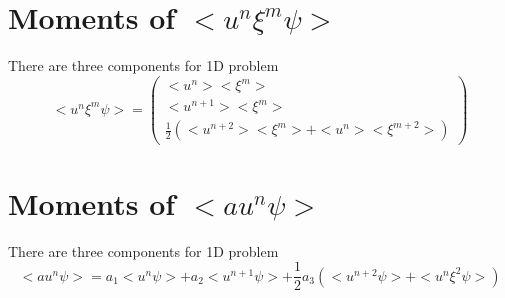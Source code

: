 \documentclass[a4paper]{book}
\begin{document}
\begin{appendices}
    \section*{Moments of $<u^n\xi^m\psi>$}
    There are three components for 1D problem
    $$
    <u^n\xi^m\psi>=\begin{pmatrix}
        <u^n><\xi^m>\\
        <u^{n+1}><\xi^m>\\
        \frac{1}{2}\left(<u^{n+2}><\xi^m>+<u^n><\xi^{m+2}>\right)
    \end{pmatrix} 
    $$

    \section*{Moments of $<au^n\psi>$}
    There are three components for 1D problem
    $$<au^n\psi>=a_1<u^n\psi>+a_2<u^{n+1}\psi>+\frac{1}{2}a_3\left(<u^{n+2}\psi>+<u^n\xi^2\psi>\right)$$

\end{appendices}

\cleardoublepage
{}
{}


\end{document}
